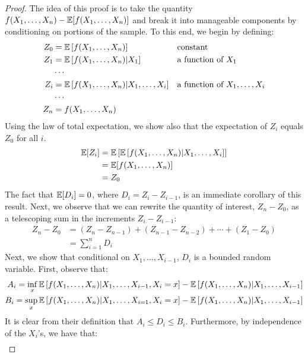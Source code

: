 \begin{proof}
    The idea of this proof is to take the quantity $f(X_1,\dots,X_n) - \operatorname*{\mathbb{E}}[f(X_1,\dots,X_n)]$ and break it into manageable components by conditioning on portions of the sample. To this end, we begin by defining:
	\begin{align*}
	 	Z_0 &= \operatorname*{\mathbb{E}} \left[f(X_1,\dots,X_n) \right] &&\text{constant}\\
	 	Z_1 &= \operatorname*{\mathbb{E}} \left[f(X_1,\dots,X_n) \lvert X_1 \right] &&\text{a function of $X_1$} \\
        &\cdots \\
        Z_i &= \operatorname*{\mathbb{E}} \left [f(X_1,\dots,X_n) | X_1,\dots,X_i \right] &&\text{a function of $X_1,\dots,X_i$} \\
	 	&\cdots \\
        Z_n &= f(X_1,\dots,X_n)
	\end{align*}
    Using the law of total expectation, we show also that the expectation of $Z_i$ equals $Z_0$ for all $i$.
    \begin{align*}
        \operatorname*{\mathbb{E}} [Z_i] &= \operatorname*{\mathbb{E}} \left [ \operatorname*{\mathbb{E}} \left [f(X_1,\dots,X_n) | X_1,\dots,X_i \right] \right] \\
        &= \operatorname*{\mathbb{E}}[f(X_1,\dots,X_n)] \\
        &= Z_0
    \end{align*}
    The fact that $\operatorname*{\mathbb{E}}[D_i] = 0$, where $D_i = Z_i - Z_{i - 1}$, is an immediate corollary of this result. Next, we observe that we can rewrite the quantity of interest, $Z_n - Z_0$, as a telescoping sum in the increments $Z_i - Z_{i - 1}$:
    \begin{align*}
        Z_n - Z_0 &= (Z_n - Z_{n - 1}) + (Z_{n - 1} - Z_{n - 2}) + \cdots + (Z_1 - Z_0) \\
        &= \sum_{i = 1}^n D_i
    \end{align*} 
    Next, we show that conditional on $X_1,\dots,X_{i - 1}$, $D_i$ is a bounded random variable. First, observe that:
    \begin{align*}
        A_i = \inf_x \operatorname*{\mathbb{E}} \left[ f(X_1,\dots,X_n) | X_1,\dots,X_{i - 1}, X_i = x \right] - \operatorname*{\mathbb{E}} \left[ f(X_1,\dots,X_n) | X_1,\dots,X_{i - 1} \right] \\
        B_i = \sup_x \operatorname*{\mathbb{E}} \left [ f(X_1,\dots,X_n) | X_1,\dots,X_{i = 1}, X_i = x \right] - \operatorname*{\mathbb{E}} \left[ f(X_1,\dots,X_n) | X_1,\dots,X_{i - 1} \right]
    \end{align*}
    It is clear from their definition that $A_i \leq D_i \leq B_i$. Furthermore, by independence of the $X_i$'s, we have that:
    \begin{align*}

\end{align*}
\end{proof}
